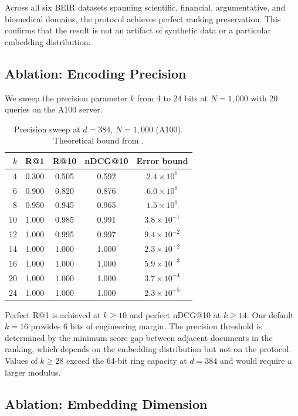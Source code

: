\documentclass[11pt]{article}
\begin{document}
Across all six BEIR datasets spanning scientific, financial, argumentative, and biomedical domains, the protocol achieves perfect ranking preservation. This confirms that the result is not an artifact of synthetic data or a particular embedding distribution.

\subsection{Ablation: Encoding Precision}

We sweep the precision parameter $k$ from 4 to 24 bits at $N = 1{,}000$ with 20 queries on the A100 server.

\begin{table}[h]
\centering
\caption{Precision sweep at $d = 384$, $N = 1{,}000$ (A100). Theoretical bound from .}
\label{tab:precision}
\begin{tabular}{rcccc}
\toprule
$k$ & R@1 & R@10 & nDCG@10 & Error bound \\
\midrule
4 & 0.300 & 0.505 & 0.592 & $2.4 \times 10^{1}$ \\
6 & 0.900 & 0.820 & 0.876 & $6.0 \times 10^{0}$ \\
8 & 0.950 & 0.945 & 0.965 & $1.5 \times 10^{0}$ \\
10 & 1.000 & 0.985 & 0.991 & $3.8 \times 10^{-1}$ \\
12 & 1.000 & 0.995 & 0.997 & $9.4 \times 10^{-2}$ \\
14 & 1.000 & 1.000 & 1.000 & $2.3 \times 10^{-2}$ \\
16 & 1.000 & 1.000 & 1.000 & $5.9 \times 10^{-3}$ \\
20 & 1.000 & 1.000 & 1.000 & $3.7 \times 10^{-4}$ \\
24 & 1.000 & 1.000 & 1.000 & $2.3 \times 10^{-5}$ \\
\bottomrule
\end{tabular}
\end{table}

Perfect R@1 is achieved at $k \geq 10$ and perfect nDCG@10 at $k \geq 14$. Our default $k = 16$ provides 6 bits of engineering margin. The precision threshold is determined by the minimum score gap between adjacent documents in the ranking, which depends on the embedding distribution but not on the protocol. Values of $k \geq 28$ exceed the 64-bit ring capacity at $d = 384$ and would require a larger modulus.

\subsection{Ablation: Embedding Dimension}
\end{document}
